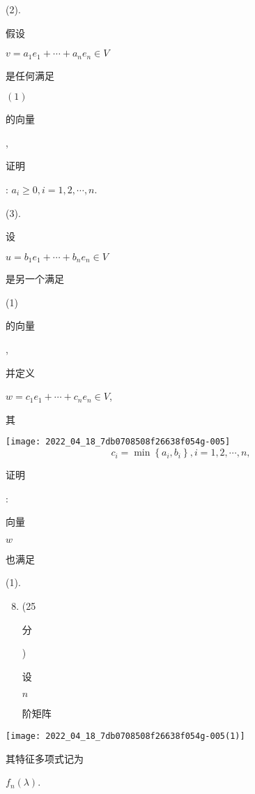 \documentclass[10pt]{article}
\begin{document}
(2). \begin{CJK}{UTF8}{mj}假设\end{CJK} $v=a_{1} e_{1}+\cdots+a_{n} e_{n} \in V$ \begin{CJK}{UTF8}{mj}是任何满足\end{CJK} $(1)$ \begin{CJK}{UTF8}{mj}的向量\end{CJK}, \begin{CJK}{UTF8}{mj}证明\end{CJK}: $a_{i} \geqslant 0, i=1,2, \cdots, n$.

(3). \begin{CJK}{UTF8}{mj}设\end{CJK} $u=b_{1} e_{1}+\cdots+b_{n} e_{n} \in V$ \begin{CJK}{UTF8}{mj}是另一个满足\end{CJK} (1) \begin{CJK}{UTF8}{mj}的向量\end{CJK}, \begin{CJK}{UTF8}{mj}并定义\end{CJK} $w=c_{1} e_{1}+\cdots+c_{n} e_{n} \in V$, \begin{CJK}{UTF8}{mj}其\end{CJK}

\texttt{[image: 2022\_04\_18\_7db0708508f26638f054g-005]}
$$
c_{i}=\min \left\{a_{i}, b_{i}\right\}, i=1,2, \cdots, n,
$$
\begin{CJK}{UTF8}{mj}证明\end{CJK}: \begin{CJK}{UTF8}{mj}向量\end{CJK} $w$ \begin{CJK}{UTF8}{mj}也满足\end{CJK} (1).

\begin{enumerate}
  \setcounter{enumi}{7}
  \item (25 \begin{CJK}{UTF8}{mj}分\end{CJK}) \begin{CJK}{UTF8}{mj}设\end{CJK} $n$ \begin{CJK}{UTF8}{mj}阶矩阵\end{CJK}
\end{enumerate}
\texttt{[image: 2022\_04\_18\_7db0708508f26638f054g-005(1)]}

\begin{CJK}{UTF8}{mj}其特征多项式记为\end{CJK} $f_{n}(\lambda)$.
\end{document}
